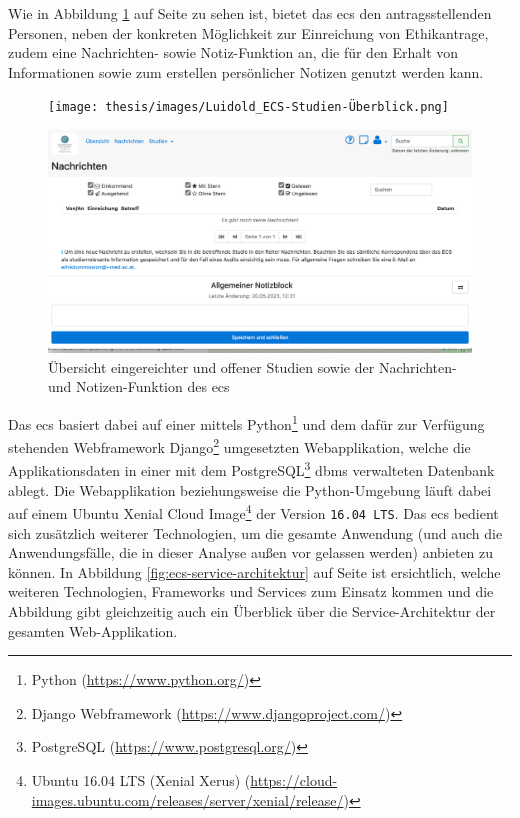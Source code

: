 \documentclass[a4paper,12pt,twoside]{scrreprt}
\begin{document}
Wie in Abbildung \ref{fig:ecs-studien-nachrichten-notizen} auf Seite \pageref{fig:ecs-studien-nachrichten-notizen} zu sehen ist, bietet das \ac{ecs} den antragsstellenden Personen, neben der konkreten Möglichkeit zur Einreichung von Ethikantrage, zudem eine Nachrichten- sowie Notiz-Funktion an, die für den Erhalt von Informationen sowie zum erstellen persönlicher Notizen genutzt werden kann.

\begin{figure}[ht!]
    \centering
    \begin{minipage}[t]{.85\linewidth}
        \texttt{[image: thesis/images/Luidold\_ECS-Studien-Überblick.png]}
    \end{minipage}
    \begin{minipage}[b]{.85\linewidth}
        \includegraphics[width=\linewidth]{thesis/images/Luidold_ECS-Nachrichten-Notizen.png}
    \end{minipage}
    \caption[Übersicht eingereichter und offener Studien (oben) sowie der Nachrichten- und Notizen-Funktion (unten) des \acl{ecs}]{Übersicht eingereichter und offener Studien sowie der Nachrichten- und Notizen-Funktion des \acl{ecs} \cite{ethikkommission_der_medizinischen_universitat_innsbruck_ethikkommission_2023}}
    \label{fig:ecs-studien-nachrichten-notizen}
\end{figure}

Das \acl{ecs} basiert dabei auf einer mittels Python\footnote{Python (\url{https://www.python.org/})} und dem dafür zur Verfügung stehenden Webframework Django\footnote{Django Webframework (\url{https://www.djangoproject.com/})} umgesetzten Webapplikation, welche die Applikationsdaten in einer mit dem PostgreSQL\footnote{PostgreSQL (\url{https://www.postgresql.org/})} \ac{dbms} verwalteten Datenbank ablegt. Die Webapplikation beziehungsweise die Python-Umgebung läuft dabei auf einem Ubuntu Xenial Cloud Image\footnote{Ubuntu 16.04 LTS (Xenial Xerus) (\url{https://cloud-images.ubuntu.com/releases/server/xenial/release/})} der Version \texttt{16.04 LTS}. Das \ac{ecs} bedient sich zusätzlich weiterer Technologien, um die gesamte Anwendung (und auch die Anwendungsfälle, die in dieser Analyse außen vor gelassen werden) anbieten zu können. In Abbildung \ref{fig:ecs-service-architektur} auf Seite \pageref{fig:ecs-service-architektur} ist ersichtlich, welche weiteren Technologien, Frameworks und Services zum Einsatz kommen und die Abbildung gibt gleichzeitig auch ein Überblick über die Service-Architektur der gesamten Web-Applikation. \cite{medizinische_universitat_wien_ecs-docs_about-2021, medizinische_universitat_wien_ecs-handbook_development-2021}
\end{document}
